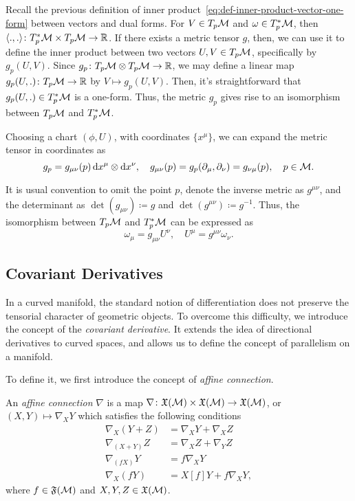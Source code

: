 Recall the previous definition of inner product~\eqref{eq:def-inner-product-vector-one-form} between vectors and dual forms. For $V \in T_p \mathcal{M}$ and $\omega \in T^*_p \mathcal{M}$, then $\langle ., . \rangle \colon T^*_p \mathcal{M} \times T_p \mathcal{M} \to \mathbb{R}$. If there exists a metric tensor $g$, then, we can use it to define the inner product between two vectors $U,V \in T_p \mathcal{M}$, specifically by $g_p(U,V)$. Since $g_p \colon T_p \mathcal{M} \otimes T_p \mathcal{M} \to \mathbb{R}$, we may define a linear map $g_p(U,.) \colon T_p \mathcal{M} \to \mathbb{R}$ by $V \mapsto g_p(U,V)$. Then, it's straightforward that $g_p(U,.) \in T^*_p \mathcal{M}$ is a one-form. Thus, the metric $g_p$ gives rise to an isomorphism between $T_p \mathcal{M}$ and $T^*_p \mathcal{M}$.

Choosing a chart $(\phi,U)$, with coordinates $\{ x^\mu \}$, we can expand the metric tensor in coordinates as
\begin{equation}
	g_p = g_{\mu\nu}(p) \mathop{}\!\mathrm{d} x^\mu \otimes \mathop{}\!\mathrm{d} x^\nu, \quad g_{\mu\nu}(p) = g_p (\partial_\mu, \partial_\nu) = g_{\nu\mu}(p), \quad p \in \mathcal{M}.
\end{equation}

It is usual convention to omit the point $p$, denote the inverse metric as $g^{\mu\nu}$, and the determinant as $\det(g_{\mu\nu}) \coloneq g$ and $\det(g^{\mu\nu}) \coloneq g^{-1}$. Thus, the isomorphism between $T_p \mathcal{M}$ and $T^*_p \mathcal{M}$ can be expressed as
\begin{equation}
	\omega_\mu = g_{\mu\nu} U^\nu, \quad U^\mu = g^{\mu\nu} \omega_\nu .
\end{equation}

\subsection{Covariant Derivatives}
In a curved manifold, the standard notion of differentiation does not preserve the tensorial character of geometric objects. To overcome this difficulty, we introduce the concept of the \emph{covariant derivative}. It extends the idea of directional derivatives to curved spaces, and allows us to define the concept of parallelism on a manifold.

To define it, we first introduce the concept of \emph{affine connection}.
\begin{definition}
    An \emph{affine connection} $\nabla$ is a map $\nabla \colon \mathfrak{X}(\mathcal{M}) \times \mathfrak{X}(\mathcal{M}) \to \mathfrak{X}(\mathcal{M})$, or $(X,Y) \mapsto \nabla_X Y$ which satisfies the following conditions
    \begin{subequations}
        \begin{align}
            \nabla_X (Y + Z) &= \nabla_X Y + \nabla_X Z \\
            \nabla_{(X+Y)} Z &= \nabla_X Z + \nabla_Y Z \\
            \nabla_{(fX)} Y &= f \nabla_X Y \\
            \nabla_X (fY) &= X[f] Y + f \nabla_X Y,
        \end{align}
    \end{subequations}
    where $f \in \mathfrak{F}(\mathcal{M})$ and $X,Y,Z \in \mathfrak{X}(\mathcal{M})$.
\end{definition}

